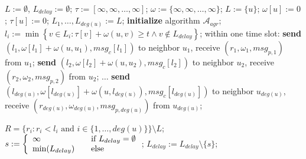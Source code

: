 \documentclass[11pt]{article}
\begin{document}
\begin{algorithm}[H]
\small
\begin{algorithmic}[1]
\STATE {}
\STATE $L:=\emptyset$, $L_{delay}:=\emptyset$;
\STATE $\tau:=[\infty,\infty,\dots,\infty]$; 
\STATE $\omega:=\{\infty,\infty,\dots,\infty\}$; 
        \STATE $L:=\{u\}$;
        \STATE $\omega[u]:=0$;
        \STATE $\tau[u]:=0$;
\ENDIF
\STATE $L_1,\dots,L_{deg(u)}:=L$;
\STATE \textbf{initialize} algorithm $\mathcal{A}_{agr}$;
                \STATE $l_i:=\min\left\{v\in L_i : \tau[v]+\omega(u,v)\ge t\wedge v\notin L_{delay}\right\}$;
        \ENDFOR
        \STATE within one time slot:
        \newline \textbf{send} $\left(l_1,\omega[l_1]+\omega\left(u,u_1\right), msg_c[l_1]\right)$ to neighbor $u_1$, receive $\left(r_1,\omega_1, msg_{p,1}\right)$ from $u_1$;
        \newline \textbf{send} $\left(l_2,\omega[l_2]+\omega\left(u,u_2\right), msg_c[l_2]\right)$ to neighbor $u_2$, receive $\left(r_2,\omega_2, msg_{p,2}\right)$ from $u_2$;
        \newline $\dots$
        \newline \textbf{send} $\left(l_{deg(u)},\omega[l_{deg(u)}]+\omega\left(u,l_{deg(u)}\right), msg_c[l_{deg(u)}]\right)$ to neighbor $u_{deg(u)}$, receive $\left(r_{deg(u)},\omega_{deg(u)}, msg_{p,deg(u)}\right)$ from $u_{deg(u)}$;
        
        \STATE $R=\{r_i:r_i<l_i\text{ and }i\in \{1,\dots,deg(u)\}\}\setminus L$;
        \STATE $s:=\left\{
          \begin{array}{l l}
            \infty & \quad \text{if $L_{delay} = \emptyset$}\\
            \min(L_{delay}) & \quad \text{else}
          \end{array} \right.$;
                \STATE $L_{delay}:=L_{delay}\setminus\{s\}$;
        \ENDIF
        

\end{algorithmic}
\end{algorithm}
\end{document}
